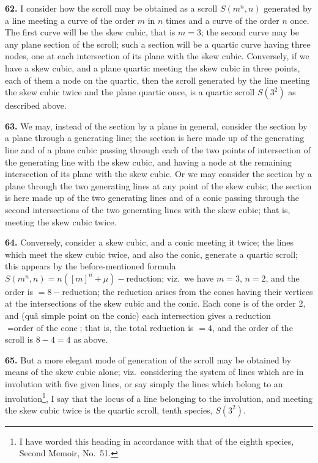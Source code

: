 \documentclass[11pt,a4paper]{article}
\begin{document}
\textbf{62.} I consider how the scroll may be obtained as a scroll $S(m^n, n)$ generated by a line meeting a curve of the order $m$ in $n$ times and a curve of the order $n$ once. The first curve will be the skew cubic, that is $m=3$; the second curve may be any plane section of the scroll; such a section will be a quartic curve having three nodes, one at each intersection of its plane with the skew cubic. Conversely, if we have a skew cubic, and a plane quartic meeting the skew cubic in three points, each of them a node on the quartic, then the scroll generated by the line meeting the skew cubic twice and the plane quartic once, is a quartic scroll $S(3^2)$ as described above.

\textbf{63.} We may, instead of the section by a plane in general, consider the section by a plane through a generating line; the section is here made up of the generating line and of a plane cubic passing through each of the two points of intersection of the generating line with the skew cubic, and having a node at the remaining intersection of its plane with the skew cubic. Or we may consider the section by a plane through the two generating lines at any point of the skew cubic; the section is here made up of the two generating lines and of a conic passing through the second intersections of the two generating lines with the skew cubic; that is, meeting the skew cubic twice.

\textbf{64.} Conversely, consider a skew cubic, and a conic meeting it twice; the lines which meet the skew cubic twice, and also the conic, generate a quartic scroll; this appears by the before-mentioned formula $S(m^n, n) = n([m]^n + \mu) - \text{reduction}$; viz.\ we have $m=3$, $n=2$, and the order is $= 8 - \text{reduction}$; the reduction arises from the cones having their vertices at the intersections of the skew cubic and the conic. Each cone is of the order 2, and (qu\^{a} simple point on the conic) each intersection gives a reduction $= \text{order of the cone}$; that is, the total reduction is $=4$, and the order of the scroll is $8 - 4 = 4$ as above.

\textbf{65.} But a more elegant mode of generation of the scroll may be obtained by means of the skew cubic alone; viz.\ considering the system of lines which are in involution with five given lines, or say simply the lines which belong to an involution\footnote{I have worded this heading in accordance with that of the eighth species, Second Memoir, No.~51.}, I say that the locus of a line belonging to the involution, and meeting the skew cubic twice is the quartic scroll, tenth species, $S(3^2)$.
\end{document}
